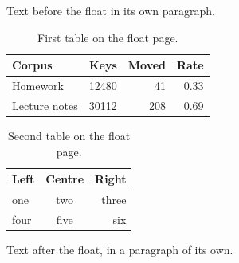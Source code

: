 \documentclass[12pt]{article}
\begin{document}
Text before the float in its own paragraph.

\begin{table}[p]
  \centering
  \caption{First table on the float page.}
  \begin{tabular}{lrrr}
    \toprule
    Corpus & Keys & Moved & Rate \\
    \midrule
    Homework & 12480 & 41 & 0.33 \\
    Lecture notes & 30112 & 208 & 0.69 \\
    \bottomrule
  \end{tabular}
\end{table}

\begin{table}[p]
  \centering
  \begin{tabular}{lcr}\hline Left & Centre & Right\\\hline one & two & three\\ four & five & six\\\hline\end{tabular}
  \caption{Second table on the float page.}
\end{table}

Text after the float, in a paragraph of its own.
\end{document}
